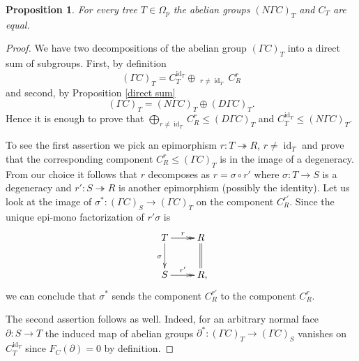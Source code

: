 \documentclass[a4paper]{amsart}
\theoremstyle{plain}
\newtheorem{prop}[thm]{Proposition}
\theoremstyle{definition}
\theoremstyle{remark}
\DeclareMathOperator{\id}{id}
\newcommand{\rpd}{\Omega_p}
\newcommand{\To}{\longrightarrow}
\numberwithin{equation}{section}
\numberwithin{figure}{section}
\begin{document}
\begin{prop}\label{counit}
For every tree $T\in\rpd$ the abelian groups  $(N\Gamma C)_T$ and $C_T$ are equal.
\end{prop}
\begin{proof}
We have two decompositions of the abelian group $(\Gamma C)_T$ into a direct sum of subgroups. First, by definition
\[
(\Gamma C)_T=C_T^{\id_T}\oplus \mathop{\bigoplus_{T\stackrel{r}{\twoheadrightarrow}R}}_{r\ne\id_T} C_R^r
\]
and second, by Proposition \ref{direct sum}
\[
(\Gamma C)_T=(N\Gamma C)_T\oplus (D\Gamma C)_T.
\]
Hence it is enough to prove that $\bigoplus_{r\ne\id_T} C_R^r
\le (D\Gamma C)_T$ and $C_T^{\id_T}\le (N\Gamma C)_T$.

To see the first assertion we pick an epimorphism $r\colon T\twoheadrightarrow R$, $r\ne \id_T$ and prove that the corresponding component $C_R^r\le (\Gamma C)_T$ is in the image of a degeneracy. From our choice it follows that $r$ decomposes as $r=\sigma\circ r'$ where $\sigma\colon T\To S$ is a degeneracy and $r'\colon S\twoheadrightarrow R$ is another epimorphism (possibly the identity). Let us look at the image of $\sigma^*\colon(\Gamma C)_S\To (\Gamma C)_T$ on the component $C_R^{r'}$. Since the unique epi-mono factorization of $r'\sigma$ is
\[
\xymatrix{T\ar@{>>}[r]^r\ar[d]_\sigma &R\ar@{=}[d]\\
S\ar@{>>}[r]^{r'} &R{\rlap ,}}
\]
we can conclude that $\sigma^*$ sends the component $C_R^{r'}$ to the component $C_R^r$.

The second assertion follows as well. Indeed, for an arbitrary normal face $\partial\colon S\To T$ the induced map of abelian groups $\partial^*\colon(\Gamma C)_T\To (\Gamma C)_S$ vanishes on $C_T^{\id_T}$ since $F_C(\partial)=0$ by definition.
\end{proof}
\end{document}
